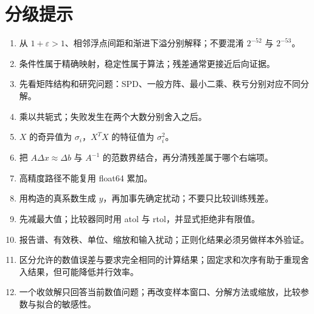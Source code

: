 \section*{分级提示}
\begingroup\small
\begin{enumerate}[nosep,leftmargin=*]
\item 从 $1+\varepsilon>1$、相邻浮点间距和渐进下溢分别解释；不要混淆 $2^{-52}$ 与 $2^{-53}$。
\item 条件性属于精确映射，稳定性属于算法；残差通常更接近后向证据。
\item 先看矩阵结构和研究问题：SPD、一般方阵、最小二乘、秩亏分别对应不同分解。
\item 乘以共轭式；失败发生在两个大数分别舍入之后。
\item $X$ 的奇异值为 $\sigma_i$，$X^TX$ 的特征值为 $\sigma_i^2$。
\item 把 $A\Delta x\approx\Delta b$ 与 $A^{-1}$ 的范数界结合，再分清残差属于哪个右端项。
\item 高精度路径不能复用 float64 累加。
\item 用构造的真系数生成 $y$，再加事先确定扰动；不要只比较训练残差。
\item 先减最大值；比较器同时用 atol 与 rtol，并显式拒绝非有限值。
\item 报告谱、有效秩、单位、缩放和输入扰动；正则化结果必须另做样本外验证。
\item 区分允许的数值误差与要求完全相同的计算结果；固定求和次序有助于重现舍入结果，但可能降低并行效率。
\item 一个收敛解只回答当前数值问题；再改变样本窗口、分解方法或缩放，比较参数与拟合的敏感性。
\end{enumerate}
\endgroup


\MFQMappedUpperFourteenHints
